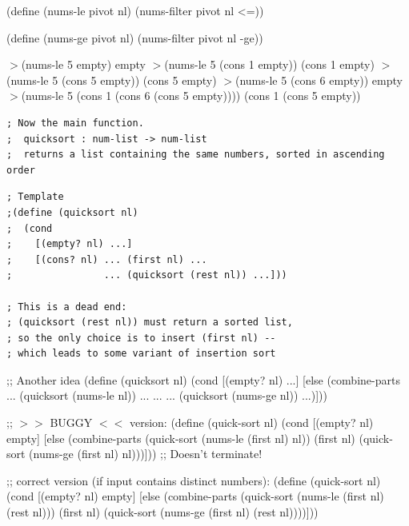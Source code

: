 \documentclass{article}
\begin{document}
\begin{schemedisplay}
(define (nums-le pivot nl)
  (nums-filter pivot nl <=))

(define (nums-ge pivot nl)
  (nums-filter pivot nl -ge))
\end{schemedisplay}

\begin{schemedisplay}
$>$(nums-le 5 empty) 
empty
$>$(nums-le 5 (cons 1 empty))
(cons 1 empty)
$>$(nums-le 5 (cons 5 empty))
(cons 5 empty)
$>$(nums-le 5 (cons 6 empty))
empty
$>$(nums-le 5 (cons 1 (cons 6 (cons 5 empty))))
(cons 1 (cons 5 empty))
\end{schemedisplay}

\begin{verbatim}
; Now the main function.
;  quicksort : num-list -> num-list
;  returns a list containing the same numbers, sorted in ascending order
\end{verbatim}

\begin{verbatim}
; Template
;(define (quicksort nl)
;  (cond
;    [(empty? nl) ...]
;    [(cons? nl) ... (first nl) ...
;                ... (quicksort (rest nl)) ...]))

; This is a dead end:
; (quicksort (rest nl)) must return a sorted list,
; so the only choice is to insert (first nl) --
; which leads to some variant of insertion sort
\end{verbatim}

\newpage

\begin{schemedisplay}
;; Another idea
(define (quicksort nl)
  (cond
    [(empty? nl) ...]
    [else
     (combine-parts
      ... (quicksort (nums-le nl)) ...
      ...
      ... (quicksort (nums-ge nl)) ...)]))
\end{schemedisplay}

\begin{schemedisplay}
;; $>>$ BUGGY $<<$ version:
(define (quick-sort nl)
  (cond
    [(empty? nl) empty]
    [else
     (combine-parts
      (quick-sort (nums-le (first nl) nl))
      (first nl)
      (quick-sort (nums-ge (first nl) nl)))]))
;; Doesn't terminate!
\end{schemedisplay}

\begin{schemedisplay}
;; correct version (if input contains distinct numbers):
(define (quick-sort nl)
  (cond
    [(empty? nl) empty]
    [else
     (combine-parts
      (quick-sort (nums-le (first nl) (rest nl)))
      (first nl)
      (quick-sort (nums-ge (first nl) (rest nl))))]))
\end{schemedisplay}
\end{document}
